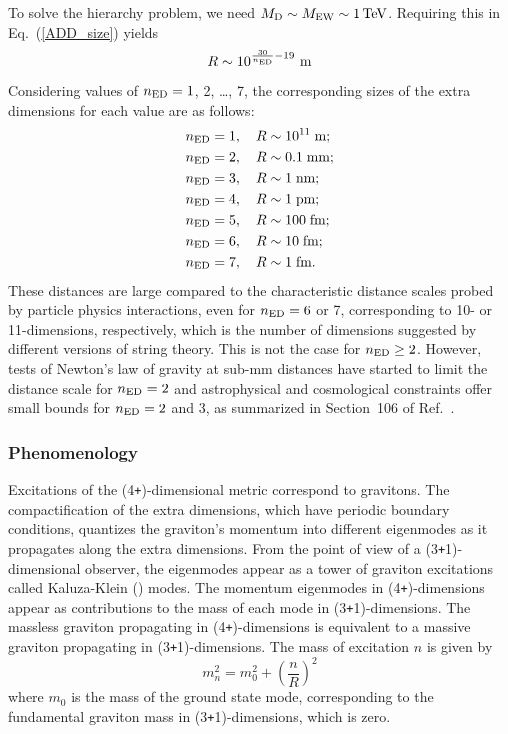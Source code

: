 To solve the hierarchy problem, we need ${M_\mathrm{D}} \sim M_{\mathrm{EW}} \sim 1\,\text{Te\hspace{-.08em}V}$. Requiring this in Eq.~(\ref{ADD_size}) yields
\begin{equation}
	R \sim 10^{\frac{30}{n_{\rm ED}}-19}~\text{m}
\end{equation}
Considering values of $n_{\rm ED}=1$, 2, \dots, 7, the corresponding sizes of the extra dimensions for each value are as follows:
\begin{align*}
	n_{\rm ED} &= 1, \quad R \sim 10^{11} \; \text{m}; \\
	n_{\rm ED} &= 2, \quad R \sim 0.1 \; \text{mm}; \\
	n_{\rm ED} &= 3, \quad R \sim 1 \; \text{nm}; \\
	n_{\rm ED} &= 4, \quad R \sim 1 \; \text{pm}; \\
	n_{\rm ED} &= 5, \quad R \sim 100 \; \text{fm}; \\
	n_{\rm ED} &= 6, \quad R \sim 10 \; \text{fm}; \\
	n_{\rm ED} &= 7, \quad R \sim 1 \; \text{fm}.
\end{align*}
These distances are large compared to the characteristic distance scales probed by particle physics interactions, even for $n_{\rm ED}=6$ or 7, corresponding to 10- or 11-dimensions, respectively, which is the number of dimensions suggested by different versions of string theory.  This is not the case for $n_{\rm ED} \ge 2$. However, tests of Newton's law of gravity at sub-mm distances have started to limit the distance scale for $n_{\rm ED}=2$ and astrophysical and cosmological constraints offer small bounds for $n_{\rm ED}=2$ and 3, as summarized in Section~106 of Ref.~\cite{Tanabashi:2018oca}.


\subsubsection{Phenomenology}

Excitations of the (4\texttt{+}{\nED})-dimensional metric correspond to gravitons. The compactification of the \nED extra dimensions, which have periodic boundary conditions, quantizes the graviton's momentum into different eigenmodes as it propagates along the extra dimensions. From the point of view of a (3\texttt{+}1)-dimensional observer, the eigenmodes appear as a tower of graviton excitations called Kaluza-Klein (\KK) modes. The momentum eigenmodes in (4\texttt{+}{\nED})-dimensions appear as contributions to the mass of each \KK mode in (3\texttt{+}1)-dimensions. The massless graviton propagating in (4\texttt{+}{\nED})-dimensions is equivalent to a massive graviton propagating in (3\texttt{+}1)-dimensions. The mass of excitation $n$ is given by
\begin{equation}
	m_n^2 = m_0^2 + \left( \frac{n}{R} \right)^2
\end{equation}
where $m_0$ is the mass of the ground state \KK mode, corresponding to the fundamental graviton mass in (3\texttt{+}1)-dimensions, which is zero.

